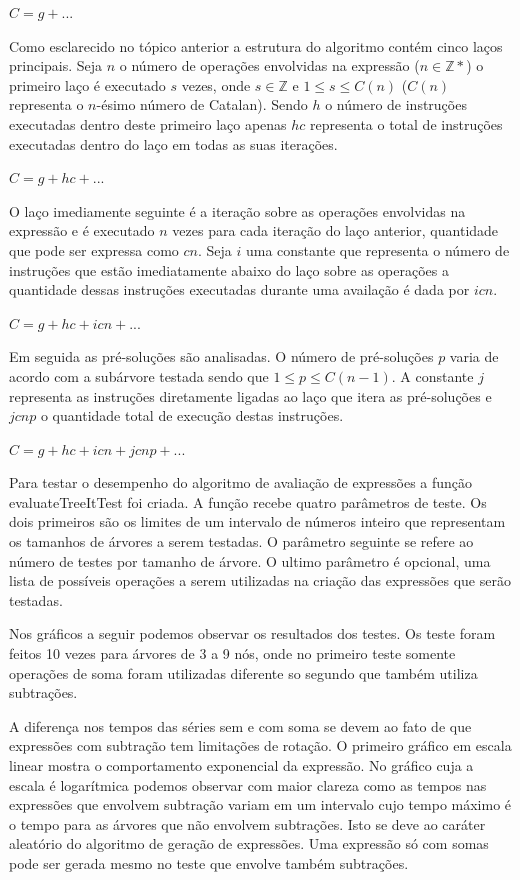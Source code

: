 $C = g + ...$

Como esclarecido no tópico anterior a estrutura do algoritmo contém cinco laços principais. Seja $n$ o número de operações envolvidas na expressão ($n \in \mathbb{Z}*$) o primeiro laço é executado $s$ vezes, onde $s \in \mathbb{Z}$ e $1 \leqslant s \leqslant C(n)$ ($C(n)$ representa o $n$-ésimo número de Catalan). Sendo $h$ o número de instruções executadas dentro deste primeiro laço apenas $hc$ representa o total de instruções executadas dentro do laço em todas as suas iterações.

$C = g + hc + ...$

O laço imediamente seguinte é a iteração sobre as operações envolvidas na expressão e é executado $n$ vezes para cada iteração do laço anterior, quantidade que pode ser expressa como $cn$. Seja $i$ uma constante que representa o número de instruções que estão imediatamente abaixo do laço sobre as operações a quantidade dessas instruções executadas durante uma availação é dada por $icn$.

$C = g + hc + icn + ...$

Em seguida as pré-soluções são analisadas. O número de pré-soluções $p$ varia de acordo com a subárvore testada sendo que $1 \leqslant p \leqslant C(n-1)$. A constante $j$ representa as instruções diretamente ligadas ao laço que itera as pré-soluções e $jcnp$ o quantidade total de execução destas instruções.

$C = g + hc + icn + jcnp + ...$



Para testar o desempenho do algoritmo de avaliação de expressões a função evaluateTreeItTest foi criada. A função recebe quatro parâmetros de teste. Os dois primeiros são os limites de um intervalo de números inteiro que representam os tamanhos de árvores a serem testadas. O parâmetro seguinte se refere ao número de testes por tamanho de árvore. O ultimo parâmetro é opcional, uma lista de possíveis operações a serem utilizadas na criação das expressões que serão testadas.

	Nos gráficos a seguir podemos observar os resultados dos testes. Os teste foram feitos 10 vezes para árvores de 3 a 9 nós, onde no primeiro teste somente operações de soma foram utilizadas diferente so segundo que também utiliza subtrações.

A diferença nos tempos das séries sem e com soma se devem ao fato de que expressões com subtração tem limitações de rotação. O primeiro gráfico em escala linear mostra o comportamento exponencial da expressão. No gráfico cuja a escala é logarítmica podemos observar com maior clareza como as tempos nas expressões que envolvem subtração variam em um intervalo cujo tempo máximo é o tempo para as árvores que não envolvem subtrações. Isto se deve ao caráter aleatório do algoritmo de geração de expressões. Uma expressão só com somas pode ser gerada mesmo no teste que envolve também subtrações.
